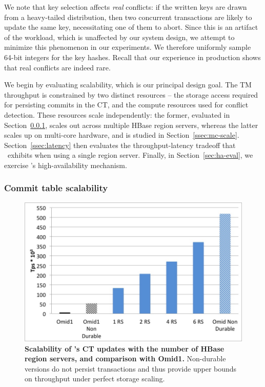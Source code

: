We note that key selection affects \emph{real} conflicts: if the written keys are drawn from a heavy-tailed distribution, then two concurrent 
transactions are likely to update the same key, necessitating one of them to abort. Since this is an artifact of the workload, which is unaffected
by our system design, we attempt to minimize this phenomenon in our experiments. We therefore uniformly sample 64-bit integers
for the key hashes. Recall that our experience in production shows that real conflicts are indeed rare.


We begin by evaluating scalability, which is our principal design goal.
The TM throughput is constrained by two distinct resources -- the storage access required for persisting commits in the CT, and
the compute resources used for conflict detection.
These resources scale independently: the former, evaluated in Section~\ref{ssec:ct-scale}, scales out across multiple HBase region servers, 
whereas the latter scales up on multi-core hardware, and is studied in Section~\ref{ssec:mc-scale}.
Section~\ref{ssec:latency} then evaluates the throughput-latency tradeoff that \sys\ exhibits when using a single region server.
Finally, in Section~\ref{sec:ha-eval}, we exercise \sys's high-availability mechanism. 

\subsubsection{Commit table scalability} 
\label{ssec:ct-scale}

\begin{figure}
\centerline{
\includegraphics[width=\figw]{CT+Omid1.png}
}
\caption{{\bf Scalability of \sys's CT updates with the number of HBase region servers, and comparison with Omid1.} Non-durable versions do not persist transactions and thus provide upper bounds on throughput under perfect storage scaling. 
}
\label{fig:ct_thpt}
\end{figure}


